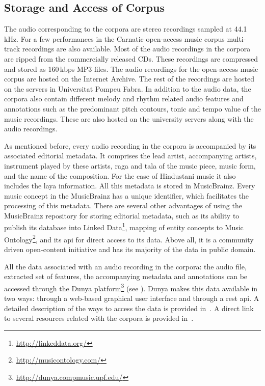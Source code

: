 \subsection{Storage and Access of Corpus}
\label{sec:corpus_storage_and_access}


The audio corresponding to the corpora are stereo recordings sampled at 44.1\,kHz. For a few performances in the Carnatic open-access music corpus multi-track recordings are also available. Most of the audio recordings in the corpora are ripped from the commercially released CDs. These recordings are compressed and stored as 160\,kbps MP3 files. The audio recordings for the open-access music corpus are hosted on the Internet Archive. The rest of the recordings are hosted on the servers in Universitat Pompeu Fabra. In addition to the audio data, the corpora also contain different melody and rhythm related audio features and annotations such as the predominant pitch contours, tonic and tempo value of the music recordings. These are also hosted on the university servers along with the audio recordings.

As mentioned before, every audio recording in the corpora is accompanied by its associated editorial metadata. It comprises the lead artist, accompanying artists, instrument played by these artists, \gls{raga} and \gls{tala} of the music piece, music form, and the name of the composition. For the case of Hindustani music it also includes the \gls{laya} information. All this metadata is stored in MusicBrainz. Every music concept in the MusicBrainz has a unique identifier, which facilitates the processing of this metadata. There are several other advantages of using the MusicBrainz repository for storing editorial metadata, such as its ability to publish its database into Linked Data\footnote{\url{http://linkeddata.org/}}, mapping of entity concepts to Music Ontology\footnote{\url{http://musicontology.com/}}, and its \acrshort{api} for direct access to its data. Above all, it is a community driven open-content initiative and has its majority of the data in public domain.

All the data associated with an audio recording in the corpora: the audio file, extracted set of features, the accompanying metadata and annotations can be accessed through the Dunya platform\footnote{\url{http://dunya.compmusic.upf.edu/}} (see ). Dunya makes this data available in two ways: through a web-based graphical user interface and through a \acrshort{rest} \acrshort{api}. A detailed description of the ways to access the data is provided in~. A direct link to several resources related with the corpora is provided in~.


